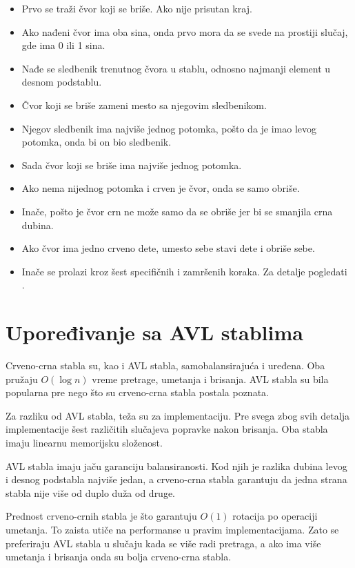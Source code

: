 \documentclass[a4paper]{article}
\begin{document}
\begin{itemize}
    \item Prvo se traži čvor koji se briše. Ako nije prisutan kraj.
    \item Ako nađeni čvor ima oba sina, onda prvo mora da se svede na prostiji slučaj, gde ima 0 ili 1 sina.
    \item Nađe se sledbenik trenutnog čvora u stablu, odnosno najmanji element u desnom podstablu.
    \item Čvor koji se briše zameni mesto sa njegovim sledbenikom.
    \item Njegov sledbenik ima najviše jednog potomka, pošto da je imao levog potomka, onda bi on bio sledbenik.
    \item Sada čvor koji se briše ima najviše jednog potomka. 
    \item Ako nema nijednog potomka i crven je čvor, onda se samo obriše.
    \item Inače, pošto je čvor crn ne može samo da se obriše jer bi se smanjila crna dubina.
    \item Ako čvor ima jedno crveno dete, umesto sebe stavi dete i obriše sebe.
    \item Inače se prolazi kroz šest specifičnih i zamršenih koraka. Za detalje pogledati \cite{cases} \cite{clrs}.
\end{itemize}

\section{Upoređivanje sa AVL stablima}
    Crveno-crna stabla su, kao i AVL stabla, samobalansirajuća i uređena. Oba pružaju $O(\log n)$ vreme pretrage, umetanja i brisanja.
    AVL stabla su bila popularna pre nego što su crveno-crna stabla postala poznata.

    Za razliku od AVL stabla, teža su za implementaciju. Pre svega zbog svih detalja implementacije šest različitih slučajeva 
    popravke nakon brisanja.
    Oba stabla imaju linearnu memorijsku složenost.

    AVL stabla imaju jaču garanciju balansiranosti. Kod njih je razlika dubina levog i desnog podstabla najviše jedan, 
    a crveno-crna stabla garantuju da jedna strana stabla nije više od duplo duža od druge.

    Prednost crveno-crnih stabla je što garantuju $O(1)$ rotacija po operaciji umetanja. 
    To zaista utiče na performanse u pravim implementacijama. Zato se preferiraju 
    AVL stabla u slučaju kada se više radi pretraga, a ako ima više umetanja i brisanja onda
    su bolja crveno-crna stabla.
\end{document}
